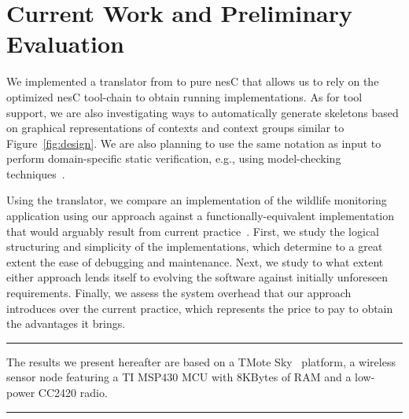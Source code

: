 \section{Current Work and Preliminary Evaluation}
\label{sec:eval}

We implemented a translator from \conesc to pure nesC that allows us
to rely on the optimized nesC tool-chain to obtain running
implementations. As for tool support, we are also investigating ways
to automatically generate \conesc skeletons based on graphical
representations of contexts and context groups similar to
Figure~\ref{fig:design}. We are also planning to use the same notation
as input to perform domain-specific static verification, e.g., using
model-checking techniques~\cite{mottolaicse}.

Using the translator, we compare an implementation of the wildlife
monitoring application using our approach against a
functionally-equivalent implementation that would arguably result from
current practice~\cite{programmingsurvey,badgersEWSN}. First, we study
the logical structuring and simplicity of the implementations, which
determine to a great extent the ease of debugging and
maintenance. Next, we study to what extent either approach lends
itself to evolving the software against initially unforeseen
requirements. Finally, we assess the system overhead that our approach
introduces over the current practice, which represents the price to
pay to obtain the advantages it brings.


\hrule
The results we present hereafter are based on a TMote
Sky~\cite{} platform, a wireless sensor node featuring a TI MSP430 MCU
with 8KBytes of RAM and a low-power CC2420 radio.
\hrule

